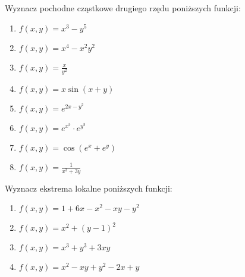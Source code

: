 \documentclass[12pt,a4paper]{article}
\begin{document}
 
	Wyznacz pochodne cząstkowe drugiego rzędu poniższych funkcji:
	\begin{enumerate}
		\item $f(x,y)=x^3-y^5$
		\item $f(x,y)=x^4-x^2y^2$
		\item $f(x,y)=\frac{x}{y^2}$
		\item $f(x,y)=x\sin(x+y)$
		\item $f(x,y)=e^{2x-y^2}$
		\item $f(x,y)=e^{x^3} \cdot e^{y^3}$
		\item $f(x,y)=\cos(e^x+e^y)$
		\item $f(x,y)=\frac{1}{x^3+3y}$
	\end{enumerate}
	Wyznacz ekstrema lokalne poniższych funkcji:
	\begin{enumerate}
		\item $f(x,y)=1+6x-x^2-xy-y^2$
		\item $f(x,y)=x^2+(y-1)^2$
		\item $f(x,y)=x^3+y^3+3xy$
		\item $f(x,y)=x^2-xy+y^2-2x+y$
	\end{enumerate}
\end{document}
